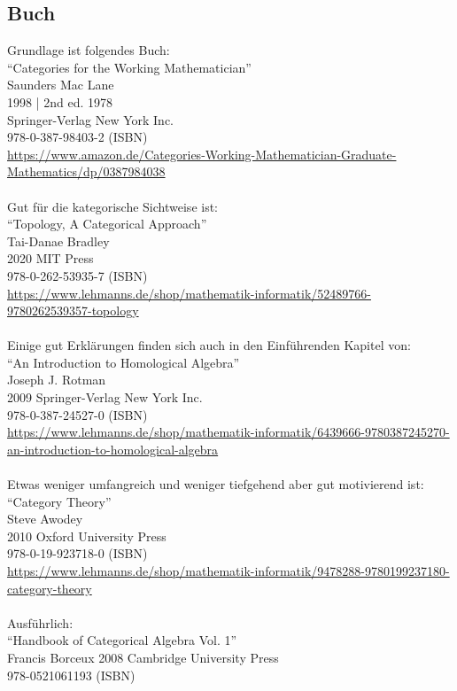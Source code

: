 \documentclass[a4paper]{amsart}
\theoremstyle{definition}
\begin{document}
\subsection*{Buch}
Grundlage ist folgendes Buch:\\
"`Categories for the Working Mathematician"'\\
Saunders Mac Lane\\
1998 | 2nd ed. 1978\\
Springer-Verlag New York Inc.\\
978-0-387-98403-2 (ISBN)\\
{\tiny
   \url{https://www.amazon.de/Categories-Working-Mathematician-Graduate-Mathematics/dp/0387984038}}\\
\\
Gut für die kategorische Sichtweise ist:\\
"`Topology, A Categorical Approach"'\\
Tai-Danae Bradley\\
2020 MIT Press\\
978-0-262-53935-7 (ISBN)\\
{\tiny
\url{https://www.lehmanns.de/shop/mathematik-informatik/52489766-9780262539357-topology}}\\
\\
Einige gut Erklärungen finden sich auch in den Einführenden Kapitel von:\\
"`An Introduction to Homological Algebra"'\\
Joseph J. Rotman\\
2009 Springer-Verlag New York Inc.\\
978-0-387-24527-0 (ISBN)\\
{\tiny \url{https://www.lehmanns.de/shop/mathematik-informatik/6439666-9780387245270-an-introduction-to-homological-algebra}}\\
\\
Etwas weniger umfangreich und weniger tiefgehend aber gut motivierend ist:\\
"`Category Theory"'\\
Steve Awodey\\
2010 Oxford University Press\\
978-0-19-923718-0 (ISBN)\\
{\tiny\url{https://www.lehmanns.de/shop/mathematik-informatik/9478288-9780199237180-category-theory}}\\
\\
Ausführlich:\\
"`Handbook of Categorical Algebra Vol. 1"'\\
Francis Borceux
2008 Cambridge University Press\\
978-0521061193 (ISBN)
\end{document}

